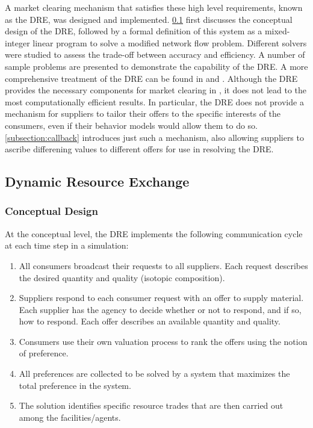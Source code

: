 A market clearing mechanism that satisfies these high level requirements,
known as the \gls{DRE}, was designed and implemented.  \ref{subsection:dre}
first discusses the conceptual design of the \gls{DRE}, followed by a formal
definition of this system as a mixed-integer linear program to solve a
modified network flow problem.  Different solvers were studied to assess the
trade-off between accuracy and efficiency.  A number of sample problems are
presented to demonstrate the capability of the \gls{DRE}.  A more
comprehensive treatment of the \gls{DRE} can be found in 
and .  Although the \gls{DRE} provides the necessary
components for market clearing in \Cyclus, it does not lead to the most
computationally efficient results.  In particular, the \gls{DRE} does not
provide a mechanism for suppliers to tailor their offers to the specific
interests of the consumers, even if their behavior models would allow them to
do so.  \ref{subsection:callback} introduces just such a mechanism, also
allowing suppliers to ascribe differening values to different offers for use
in resolving the \gls{DRE}.

\subsection{Dynamic Resource Exchange}\label{subsection:dre}

\subsubsection{Conceptual Design}

At the conceptual level, the \gls{DRE} implements the following communication
cycle at each time step in a \Cyclus simulation:
\begin{enumerate}
\item All consumers broadcast their requests to all suppliers.  Each request
  describes the desired quantity and quality (isotopic composition).
\item Suppliers respond to each consumer request with an offer to supply
  material.  Each supplier has the agency to decide whether or not to respond,
  and if so, how to respond.  Each offer describes an available quantity and
  quality.
\item Consumers use their own valuation process to rank the offers using the
  notion of preference.
\item All preferences are collected to be solved by a system that maximizes
  the total preference in the system.
\item The solution identifies specific resource trades that are then carried
  out among the facilities/agents.
\end{enumerate}

